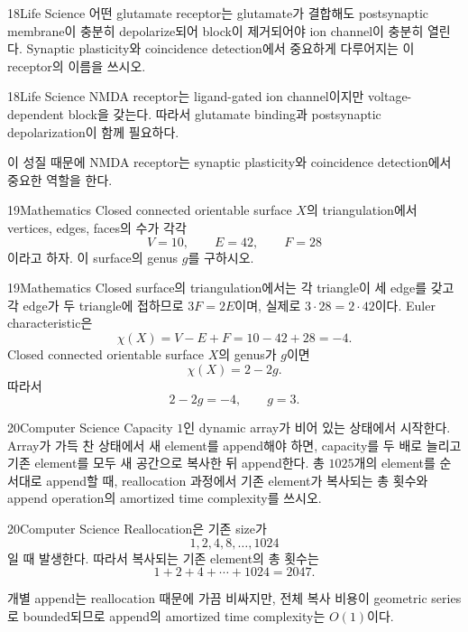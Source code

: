 \documentclass[12pt,aspectratio=169]{beamer}
\begin{document}
\begin{problemframe}{18}{Life Science}
어떤 glutamate receptor는 glutamate가 결합해도 postsynaptic membrane이 충분히 depolarize되어  block이 제거되어야 ion channel이 충분히 열린다. Synaptic plasticity와 coincidence detection에서 중요하게 다루어지는 이 receptor의 이름을 쓰시오.
\end{problemframe}

\begin{solutionframe}{18}{Life Science}
NMDA receptor는 ligand-gated ion channel이지만 voltage-dependent  block을 갖는다. 따라서 glutamate binding과 postsynaptic depolarization이 함께 필요하다.

이 성질 때문에 NMDA receptor는 synaptic plasticity와 coincidence detection에서 중요한 역할을 한다.
\end{solutionframe}

\begin{problemframe}{19}{Mathematics}
Closed connected orientable surface $X$의 triangulation에서 vertices, edges, faces의 수가 각각
\[
V=10,\qquad E=42,\qquad F=28
\]
이라고 하자. 이 surface의 genus $g$를 구하시오.
\end{problemframe}

\begin{solutionframe}{19}{Mathematics}
Closed surface의 triangulation에서는 각 triangle이 세 edge를 갖고 각 edge가 두 triangle에 접하므로 $3F=2E$이며, 실제로 $3\cdot28=2\cdot42$이다. Euler characteristic은
\[
\chi(X)=V-E+F=10-42+28=-4.
\]
Closed connected orientable surface $X$의 genus가 $g$이면
\[
\chi(X)=2-2g.
\]
따라서
\[
2-2g=-4,
\qquad g=3.
\]
\end{solutionframe}

\begin{problemframe}{20}{Computer Science}
Capacity $1$인 dynamic array가 비어 있는 상태에서 시작한다. Array가 가득 찬 상태에서 새 element를 append해야 하면, capacity를 두 배로 늘리고 기존 element를 모두 새 공간으로 복사한 뒤 append한다. 총 $1025$개의 element를 순서대로 append할 때, reallocation 과정에서 기존 element가 복사되는 총 횟수와 append operation의 amortized time complexity를 쓰시오.
\end{problemframe}

\begin{solutionframe}{20}{Computer Science}
Reallocation은 기존 size가
\[
1,2,4,8,\dots,1024
\]
일 때 발생한다. 따라서 복사되는 기존 element의 총 횟수는
\[
1+2+4+\cdots+1024=2047.
\]

개별 append는 reallocation 때문에 가끔 비싸지만, 전체 복사 비용이 geometric series로 bounded되므로 append의 amortized time complexity는 $O(1)$이다.
\end{solutionframe}
\end{document}
